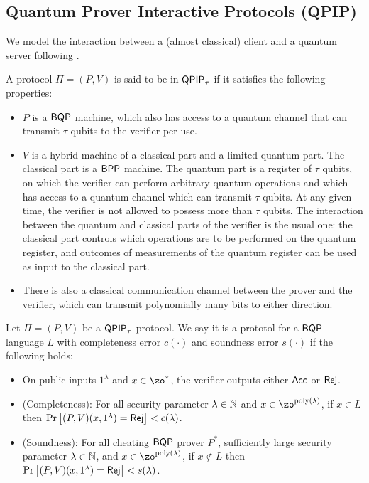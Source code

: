 \subsection{Quantum Prover Interactive Protocols (QPIP)}


We model the interaction between a (almost classical) client and a quantum server following \cite{FOCS:Mahadev18a}.

\begin{definition}
	A protocol $\Pi=(P, V)$ is said to be in $\operatorname{\mathsf{QPIP}}_\tau$ if it satisfies the following properties:
	\begin{itemize}
		\item $P$ is a $\operatorname{\mathsf{BQP}}$  machine, which also has access to a quantum channel that can transmit $\tau$ qubits to the verifier per use.
		\item $V$ is a hybrid machine of a classical part and a limited quantum part. The classical part is a $\operatorname{\mathsf{BPP}}$ machine. The quantum part is a register of $\tau$ qubits, on which the verifier can perform arbitrary quantum operations and which has access to a quantum channel which can transmit $\tau$ qubits. At any given time, the verifier is not allowed to possess more than $\tau$ qubits. The interaction between the quantum and classical parts of the verifier is the usual one: the classical part controls which operations are to be performed on the quantum register, and outcomes of measurements of the quantum register can be used as input to the classical part.
		\item There is also a classical communication channel between the prover and the verifier, which can transmit polynomially many bits to either direction.
	\end{itemize}
\end{definition}

\begin{definition}
	Let $\Pi=(P, V)$ be a $\operatorname{\mathsf{QPIP}}_\tau$ protocol.
	We say it is a prototol for a $\operatorname{\mathsf{BQP}}$ language $L$ with completeness error $c(\cdot)$ and soundness error $s(\cdot)$ if the following holds:
\begin{itemize}
		\item On public inputs $1^\lambda$ and $x\in\zo^*$, the verifier outputs either $\mathsf{Acc}$ or $\mathsf{Rej}$.
		\item (Completeness): For all security parameter $\lambda\in\mathbb{N}$ and $x\in\zo^{\poly(\lambda)}$, if $x\in L$ then
		$\Pr\left[(P, V)(x, 1^\lambda)=\mathsf{Rej}\right]<c(\lambda)$.
		\item (Soundness): For all cheating $\operatorname{\mathsf{BQP}}$ prover $P^*$, sufficiently large security parameter $\lambda\in\mathbb{N}$, and $x\in\zo^{\poly(\lambda)}$, if $x \notin L$ then $\Pr\left[(P, V)(x, 1^\lambda)=\mathsf{Rej}\right]<s(\lambda)$.
	\end{itemize}
\end{definition}

